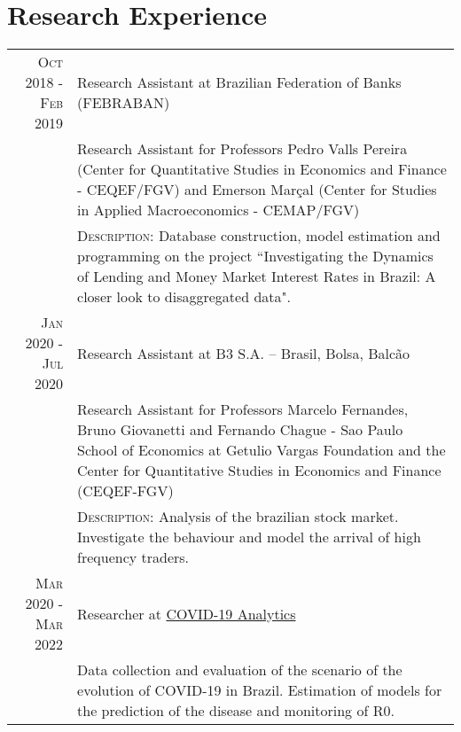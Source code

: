 \documentclass[a4paper,10pt]{article}
\begin{document}
\section{Research Experience}
\begin{tabular}{r|p{10.75cm}}
    \textsc{Oct 2018 - Feb 2019} & Research Assistant at Brazilian Federation of Banks (FEBRABAN) \\
    &\footnotesize{Research Assistant for Professors Pedro Valls Pereira (Center for Quantitative Studies in Economics and Finance - CEQEF/FGV) and Emerson Marçal (Center for Studies in Applied Macroeconomics - CEMAP/FGV)}\\
    &\footnotesize{\textsc{Description}: Database construction, model estimation and programming on the project ``Investigating the Dynamics of Lending and Money Market Interest Rates in Brazil: A closer look to disaggregated data".} \\
    \textsc{Jan 2020 - Jul 2020} & Research Assistant at B3 S.A. – Brasil, Bolsa, Balcão \\
    &\footnotesize{Research Assistant for Professors Marcelo Fernandes, Bruno Giovanetti and Fernando Chague - Sao Paulo School of Economics at Getulio Vargas Foundation and the Center for Quantitative Studies in Economics and Finance (CEQEF-FGV)} \\
    &\footnotesize{\textsc{Description}: Analysis of the brazilian stock market. Investigate the behaviour and model the arrival of high frequency traders.} \\
    \textsc{Mar 2020 - Mar 2022} & Researcher at \href{https://covid19analytics.com.br/}{COVID-19 Analytics} \\
    &\footnotesize{Data collection and evaluation of the scenario of the evolution of COVID-19 in Brazil. Estimation of models for the prediction of the disease and monitoring of R0.} 
\end{tabular}

\end{document}

